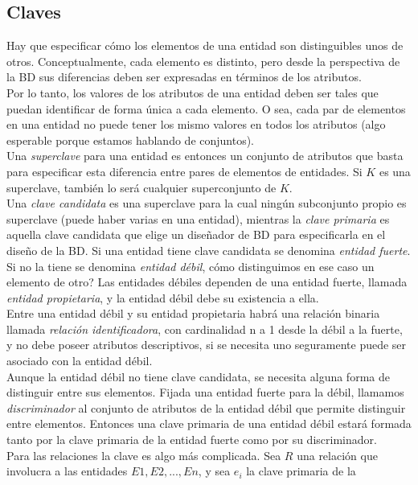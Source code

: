 \documentclass[a4paper]{article}
\begin{document}
\subsection{Claves}
Hay que especificar c\'omo los elementos de una entidad son distinguibles unos de otros.
Conceptualmente, cada elemento es distinto, pero desde la perspectiva de la BD sus
diferencias deben ser expresadas en t\'erminos de los atributos. \\
Por lo tanto, los valores de los atributos de una entidad deben ser tales que puedan
identificar de forma \'unica a cada elemento. O sea, cada par de elementos en una
entidad no puede tener los mismo valores en todos los atributos (algo esperable porque
estamos hablando de conjuntos). \\
Una \textit{superclave} para una entidad es entonces un conjunto de atributos que basta para
especificar esta diferencia entre pares de elementos de entidades. Si $K$ es una superclave,
tambi\'en lo ser\'a cualquier superconjunto de $K$. \\
Una \textit{clave candidata} es una superclave para la cual ning\'un subconjunto propio es
superclave (puede haber varias en una entidad), mientras la \textit{clave primaria} es
aquella clave candidata que elige un diseñador de BD para especificarla en el diseño de la
BD. Si una entidad tiene clave candidata se denomina \textit{entidad fuerte}. Si no la
tiene se denomina \textit{entidad d\'ebil}, c\'omo distinguimos en ese caso un elemento
de otro? Las entidades d\'ebiles dependen de una entidad fuerte, llamada \textit{entidad
propietaria}, y la entidad d\'ebil debe su existencia a ella. \\
Entre una entidad d\'ebil y su entidad propietaria habr\'a una relaci\'on binaria llamada
\textit{relaci\'on identificadora}, con cardinalidad n a 1 desde la d\'ebil a la fuerte,
y no debe poseer atributos descriptivos, si se necesita uno seguramente puede ser asociado
con la entidad d\'ebil. \\
Aunque la entidad d\'ebil no tiene clave candidata, se necesita alguna forma de distinguir
entre sus elementos. Fijada una entidad fuerte para la d\'ebil, llamamos
\textit{discriminador} al conjunto de atributos de la entidad d\'ebil que permite distinguir
entre elementos. Entonces una clave primaria de una entidad d\'ebil estar\'a formada tanto
por la clave primaria de la entidad fuerte como por su discriminador. \\
Para las relaciones la clave es algo m\'as complicada. Sea $R$ una relaci\'on que
involucra a las entidades $E1, E2, ..., En$, y sea $e_{i}$ la clave primaria de la
\end{document}
